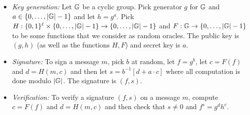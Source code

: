 \documentclass{article}
\begin{document}
\begin{enumerate}
\begin{itemize}
\item{}
\emph{Key generation:} Let $\mathbb{G}$ be a cyclic group. Pick generator $g$ for $\mathbb{G}$ and $a\in \{0,\ldots,|\mathbb{G}|-1\}$ and let $h=g^a$. Pick $H:\{0,1\}^\ell\times \{0,\ldots,|\mathbb{G}|-1\}\rightarrow \{0,\ldots,|\mathbb{G}|-1\}$ and $F:\mathbb{G}\rightarrow\{0,\ldots,|\mathbb{G}|-1\}$ to be some  functions that we consider as random oracles. The public key is $(g,h)$  (as well as the functions $H,F$) and secret key is $a$.%

\item{}
\emph{Signature:} To sign a message $m$, pick $b$ at random,  let $f=g^b$, let $c=F(f)$ and $d=H(m,c)$  and then let $s= b^{-1}[d+a\cdot c]$ where all computation is done modulo $|\mathbb{G}|$. The signature is $(f,s)$.%

\item{}
\emph{Verification:} To verify a signature $(f,s)$ on a message $m$, compute $c=F(f)$ and $d=H(m,c)$  and then check that $s\neq 0$ and $f^s=g^{d}h^{c}$.%


\end{itemize}
\end{enumerate}
\end{document}
